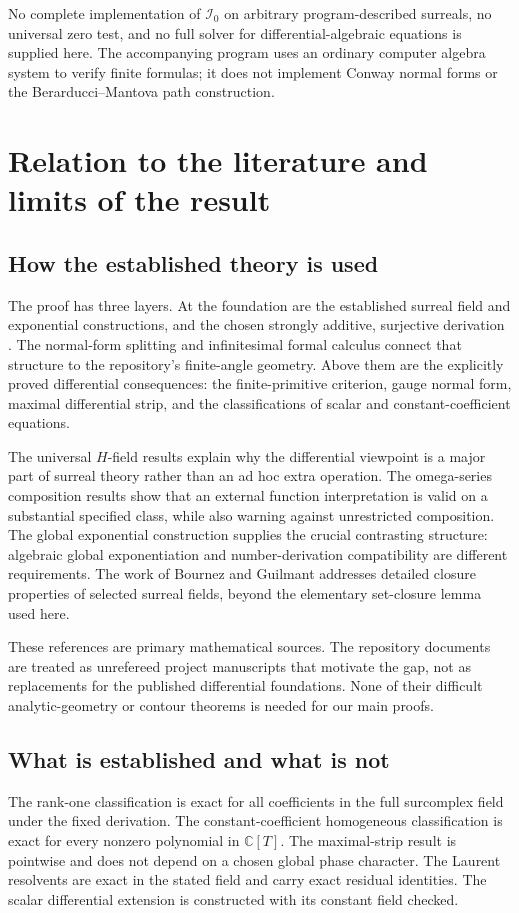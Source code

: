 \documentclass[11pt,letterpaper]{article}
\numberwithin{equation}{section}
\theoremstyle{definition}
\theoremstyle{remark}
\newcommand{\C}{\mathbb C}
\newcommand{\Izero}{\mathcal I_0}
\begin{document}
No complete implementation of $\Izero$ on arbitrary program-described surreals, no universal zero test, and no full solver for differential-algebraic equations is supplied here. The accompanying program uses an ordinary computer algebra system to verify finite formulas; it does not implement Conway normal forms or the Berarducci--Mantova path construction.

\section{Relation to the literature and limits of the result}\label{sec:limits}

\subsection{How the established theory is used}
The proof has three layers. At the foundation are the established surreal field and exponential constructions, and the chosen strongly additive, surjective derivation \cite{BM}. The normal-form splitting and infinitesimal formal calculus connect that structure to the repository's finite-angle geometry. Above them are the explicitly proved differential consequences: the finite-primitive criterion, gauge normal form, maximal differential strip, and the classifications of scalar and constant-coefficient equations.

The universal $H$-field results \cite{ADH} explain why the differential viewpoint is a major part of surreal theory rather than an ad hoc extra operation. The omega-series composition results \cite{BMGerms} show that an external function interpretation is valid on a substantial specified class, while also warning against unrestricted composition. The global exponential construction \cite{EK} supplies the crucial contrasting structure: algebraic global exponentiation and number-derivation compatibility are different requirements. The work of Bournez and Guilmant \cite{BG} addresses detailed closure properties of selected surreal fields, beyond the elementary set-closure lemma used here.

These references are primary mathematical sources. The repository documents are treated as unrefereed project manuscripts that motivate the gap, not as replacements for the published differential foundations. None of their difficult analytic-geometry or contour theorems is needed for our main proofs.

\subsection{What is established and what is not}
The rank-one classification is exact for all coefficients in the full surcomplex field under the fixed derivation. The constant-coefficient homogeneous classification is exact for every nonzero polynomial in $\C[T]$. The maximal-strip result is pointwise and does not depend on a chosen global phase character. The Laurent resolvents are exact in the stated field and carry exact residual identities. The scalar differential extension is constructed with its constant field checked.
\end{document}
